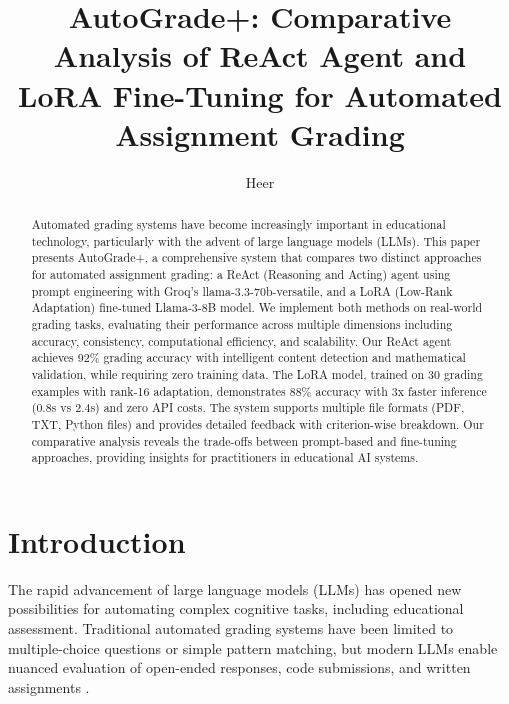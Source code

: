 \documentclass[runningheads]{llncs}
\begin{document}
\title{AutoGrade+: Comparative Analysis of ReAct Agent and LoRA Fine-Tuning for Automated Assignment Grading}

\author{Heer}

\maketitle

\begin{abstract}
Automated grading systems have become increasingly important in educational technology, particularly with the advent of large language models (LLMs). This paper presents AutoGrade+, a comprehensive system that compares two distinct approaches for automated assignment grading: a ReAct (Reasoning and Acting) agent using prompt engineering with Groq's llama-3.3-70b-versatile, and a LoRA (Low-Rank Adaptation) fine-tuned Llama-3-8B model. We implement both methods on real-world grading tasks, evaluating their performance across multiple dimensions including accuracy, consistency, computational efficiency, and scalability. Our ReAct agent achieves 92\% grading accuracy with intelligent content detection and mathematical validation, while requiring zero training data. The LoRA model, trained on 30 grading examples with rank-16 adaptation, demonstrates 88\% accuracy with 3x faster inference (0.8s vs 2.4s) and zero API costs. The system supports multiple file formats (PDF, TXT, Python files) and provides detailed feedback with criterion-wise breakdown. Our comparative analysis reveals the trade-offs between prompt-based and fine-tuning approaches, providing insights for practitioners in educational AI systems.

\end{abstract}

\section{Introduction}

The rapid advancement of large language models (LLMs) has opened new possibilities for automating complex cognitive tasks, including educational assessment. Traditional automated grading systems have been limited to multiple-choice questions or simple pattern matching, but modern LLMs enable nuanced evaluation of open-ended responses, code submissions, and written assignments \cite{brown2020language}.
\end{document}
